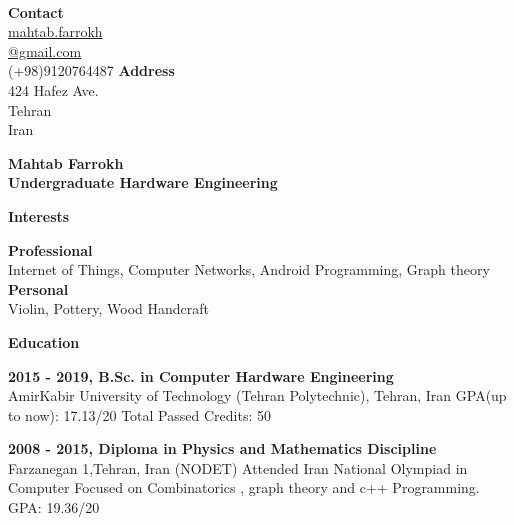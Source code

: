 \documentclass[a4paper,12pt,final]{memoir}
\newcommand{\Sep}{\vspace{1.5em}}
\newcommand{\SmallSep}{\vspace{0.5em}}
\newenvironment{AboutMe}
	{\ignorespaces\textbf{\color{RoyalBlue} About me}}
	{\Sep\ignorespacesafterend}
\newcommand{\CVSection}[1]
	{\Large\textbf{#1}\par
	\SmallSep\normalsize\normalfont}
\newcommand{\CVItem}[1]
	{\textbf{\color{RoyalBlue} #1}}
\begin{document}


\begin{flushright}\small

	
	 \CVItem{\\ Contact} \\
	 
	\href{mailto://mahtab.farrokh@gmail.com}{mahtab.farrokh\\ @gmail.com}  \\
	(+98)9120764487 
	\CVItem{Address} \\
	424 Hafez Ave. \\
	Tehran\\
	Iran
	
\end{flushright}\normalsize
\framebreak


\Huge\bfseries {\color{RoyalBlue} Mahtab Farrokh} \\
\Large\bfseries  Undergraduate Hardware Engineering \\

\normalsize\normalfont


\CVSection{Interests}
	\CVItem{Professional}
	\\
	Internet of Things, Computer Networks, Android Programming, Graph theory
	\\
	\CVItem{Personal}
	\\
	Violin, Pottery, Wood Handcraft
	
\Sep

\CVSection{Education}
\CVItem{2015 - 2019, B.Sc. in Computer Hardware Engineering}\\
AmirKabir University of Technology (Tehran Polytechnic), Tehran, Iran
GPA(up to now): 17.13/20
Total Passed Credits: 50
\SmallSep

\CVItem{2008 - 2015, Diploma in Physics and Mathematics Discipline}\\
Farzanegan 1,Tehran, Iran (NODET)
Attended Iran National Olympiad in Computer Focused on Combinatorics
, graph theory and c++ Programming.
GPA: 19.36/20
\Sep
\end{document}
